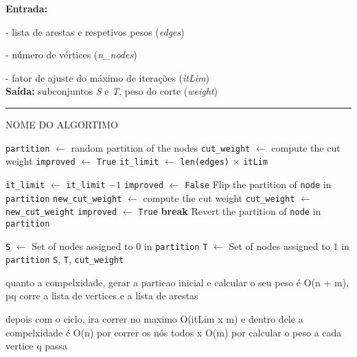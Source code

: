 \documentclass[mirror, portugues]{revdetua}
\begin{document}
\begin{algorithm}[H]
\raggedright
\textbf{Entrada:}

- lista de arestas e respetivos pesos (\textit{edges})

- número de vértices (\textit{n\_nodes})

- fator de ajuste do máximo de iterações (\textit{itLim})\\
\textbf{Saída:} subconjuntos \textit{S} e \textit{T}, peso do corte (\textit{weight}) \\
\hrule 
\caption{NOME DO ALGORTIMO}
\begin{algorithmic}[1]
    \State \texttt{partition} $\gets$ random partition of the nodes
    \State \texttt{cut\_weight} $\gets$ compute the cut weight
    \State \texttt{improved} $\gets$ \texttt{True}
    \State \texttt{it\_limit} $\gets$ \texttt{len(edges)} \ensuremath{\times} \texttt{itLim}

        \State \texttt{it\_limit} $\gets$ \texttt{it\_limit} $ - 1$
        \State \texttt{improved} $\gets$ \texttt{False}
            \State Flip the partition of \texttt{node} in \texttt{partition}
            \State \texttt{new\_cut\_weight} $\gets$ compute the cut weight
                \State \texttt{cut\_weight} $\gets$ \texttt{new\_cut\_weight}
                \State \texttt{improved} $\gets$ \texttt{True}
                \State \textbf{break}  
            \EndIf
            \State Revert the partition of \texttt{node} in \texttt{partition}
        \EndFor
    \EndWhile

    \State \texttt{S} $\gets$ Set of nodes assigned to $0$ in \texttt{partition}
    \State \texttt{T} $\gets$ Set of nodes assigned to $1$ in \texttt{partition}
    \Return \texttt{S}, \texttt{T}, \texttt{cut\_weight}
\end{algorithmic}
\end{algorithm}
    
quanto a compelxidade, gerar a particao inicial e calcular o seu peso é O(n + m), pq corre a lista de vertices e a lista de arestas

depois com o ciclo, ira correr no maximo O(itLim x m) e dentro dele a compelxidade é O(n) por correr os nós todos x O(m) por calcular o peso a cada vertice q passa
\end{document}
